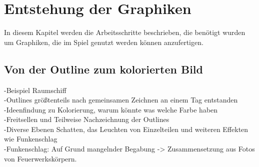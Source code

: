 \chapter{Entstehung der Graphiken}

In diesem Kapitel werden die Arbeitsschritte beschrieben, die benötigt wurden um Graphiken, die im Spiel genutzt werden können anzufertigen.

\section{Von der Outline zum kolorierten Bild} 
-Beispiel Raumschiff\\
-Outlines größtenteils nach gemeinsamen Zeichnen an einem Tag entstanden \\
-Ideenfindung zu Kolorierung, warum könnte was welche Farbe haben \\
-Freitsellen und Teilweise Nachzeichnung der Outlines \\
-Diverse Ebenen Schatten, das Leuchten von Einzelteilen und weiteren Effekten wie Funkenschlag \\
-Funkenschlag: Auf Grund mangelnder Begabung -> Zusammensetzung aus Fotos von Feuerwerkskörpern.